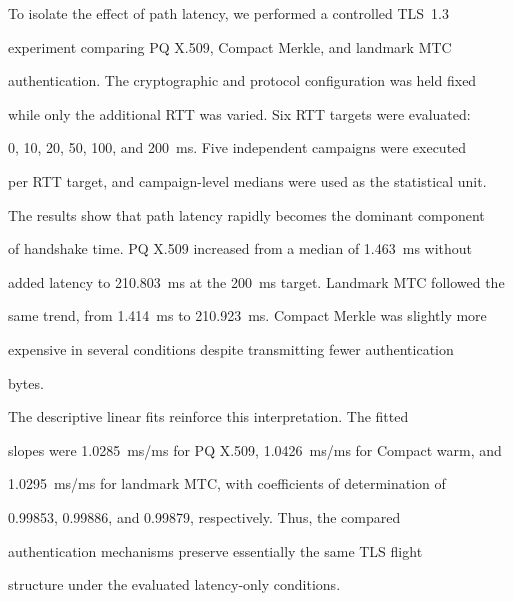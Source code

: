 \documentclass[journal]{IEEEtran}
\begin{document}
To isolate the effect of path latency, we performed a controlled TLS~1.3

experiment comparing PQ X.509, Compact Merkle, and landmark MTC

authentication. The cryptographic and protocol configuration was held fixed

while only the additional RTT was varied. Six RTT targets were evaluated:

0, 10, 20, 50, 100, and 200~ms. Five independent campaigns were executed

per RTT target, and campaign-level medians were used as the statistical unit.



The results show that path latency rapidly becomes the dominant component

of handshake time. PQ X.509 increased from a median of 1.463~ms without

added latency to 210.803~ms at the 200~ms target. Landmark MTC followed the

same trend, from 1.414~ms to 210.923~ms. Compact Merkle was slightly more

expensive in several conditions despite transmitting fewer authentication

bytes.



The descriptive linear fits reinforce this interpretation. The fitted

slopes were 1.0285~ms/ms for PQ X.509, 1.0426~ms/ms for Compact warm, and

1.0295~ms/ms for landmark MTC, with coefficients of determination of

0.99853, 0.99886, and 0.99879, respectively. Thus, the compared

authentication mechanisms preserve essentially the same TLS flight

structure under the evaluated latency-only conditions.
\end{document}
